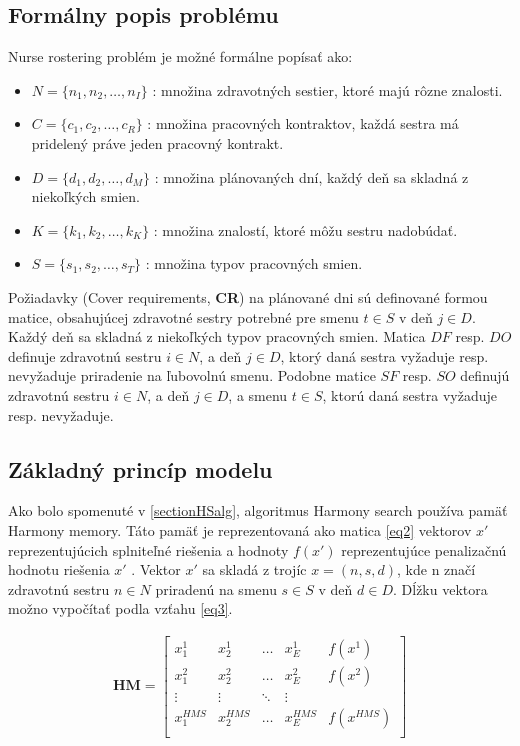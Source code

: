 \documentclass[a4paper, 14pt]{article}
\begin{document}
\subsection{Formálny popis problému}
Nurse rostering problém je možné formálne popísať ako:
\begin{itemize}
\item $N = \{n_1, n_2, \dots, n_I \} $ : množina zdravotných sestier, ktoré majú rôzne znalosti.
\item $C = \{c_1, c_2, \dots, c_R \} $ : množina pracovných kontraktov, každá sestra má pridelený práve jeden pracovný kontrakt.
\item $D = \{d_1, d_2, \dots, d_M \} $ : množina plánovaných dní, každý deň sa skladná z niekoľkých smien.
\item $K = \{k_1, k_2, \dots, k_K \} $ : množina znalostí, ktoré môžu sestru nadobúdať.
\item $S = \{s_1, s_2, \dots, s_T \} $ : množina typov pracovných smien.
\end{itemize}

Požiadavky (Cover requirements, \textbf{CR}) na plánované dni sú definované formou matice, obsahujúcej zdravotné sestry potrebné pre smenu $t \in S$ v deň $j \in D$. Každý deň sa skladná z niekoľkých typov pracovných smien. Matica $DF$ resp. $DO$ definuje zdravotnú sestru $i \in N$, a deň  $j \in D$, ktorý daná sestra vyžaduje resp. nevyžaduje priradenie na ľubovolnú smenu. Podobne matice $SF$ resp. $SO$ definujú zdravotnú sestru $i \in N$, a deň  $j \in D$, a smenu $t \in S$, ktorú daná sestra vyžaduje resp. nevyžaduje.\\

\subsection{Základný princíp modelu}
Ako bolo spomenuté v \ref{sectionHSalg}, algoritmus Harmony search používa pamäť Harmony memory. Táto pamäť je reprezentovaná ako matica \ref{eq2} vektorov $x'$ reprezentujúcich splniteľné riešenia a  hodnoty $f(x')$ reprezentujúce penalizačnú hodnotu riešenia $x'$ . Vektor $x'$ sa skladá z trojíc $x = (n,s,d)$, kde n značí zdravotnú sestru $n \in N$ priradenú na smenu $s \in S$ v deň $d \in D$. Dĺžku vektora možno vypočítať podla vzťahu \ref{eq3}.   

\begin{center}
\begin{eqnarray}
\label{eq2}
\mathbf{HM}=\left[
\begin{array}{ccccc}
x_1^1 & x_2^1 & \ldots & x_E^1 & f(x^1)\\
x_1^2 & x_2^2 & \ldots & x_E^2 & f(x^2) \\
\vdots & \vdots & \ddots & \vdots \\
x_1^{HMS} & x_2^{HMS} & \ldots & x_E^{HMS} & f(x^{HMS})\\
\end{array}\right]
\end{eqnarray}
\end{center}
\end{document}
